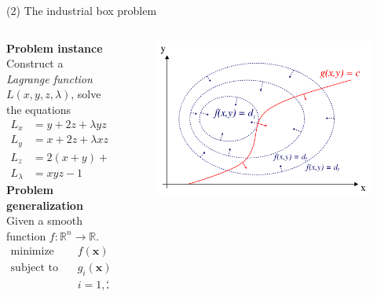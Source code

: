\documentclass[11pt, aspectratio=149]{beamer}
\theoremstyle{plain}
\begin{document}
\begin{frame}[fragile, t]{(2) The industrial box problem}
	\begin{columns}
		\begin{column}{0.6\textwidth}
			\textbf{Problem instance} \\
			Construct a \emph{Lagrange function} $L(x, y, z, \lambda)$, solve the equations
			\begin{alignat*}{3}
			L_x &= y + 2z + \lambda yz &&= 0 \\
			L_y &=x + 2z + \lambda xz &&= 0 \\
			L_z &=2 (x + y) + \lambda xy &&= 0 \\
			L_\lambda &= xyz - 1 &&= 0
			\end{alignat*}
			\textbf{Problem generalization}
			\\
			\vspace*{0.5em} 
			Given a smooth function $f: \mathbb{R}^{n} \to \mathbb{R}$.
			\begin{align*}
			\text{minimize } \quad & f(\mathbf{x}) \\
			\text{subject to } \quad & g_i(\mathbf{x}) = 0\\
			 & i=1,2,\ldots
			\end{align*}
		\end{column}
		\begin{column}{0.4\textwidth}%
			\vspace*{-10em}
			\begin{figure}
				\centering
				\includegraphics[width=1.05\linewidth]{figs/lagrange.png}
			\end{figure}
		\end{column}
	\end{columns}
\end{frame}
\end{document}
